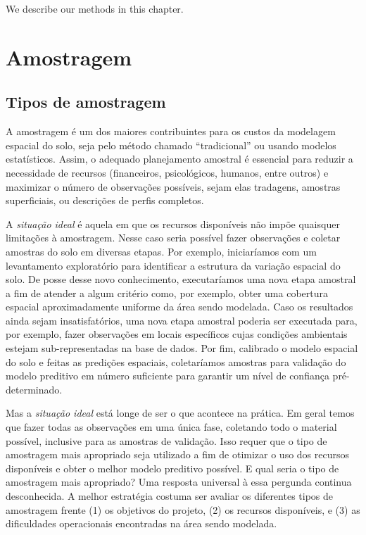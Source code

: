 \documentclass[]{book}
\begin{document}
We describe our methods in this chapter.

\chapter{Amostragem}\label{amostragem}

\section{Tipos de amostragem}\label{tipos-de-amostragem}

A amostragem é um dos maiores contribuintes para os custos da modelagem
espacial do solo, seja pelo método chamado ``tradicional'' ou usando
modelos estatísticos. Assim, o adequado planejamento amostral é
essencial para reduzir a necessidade de recursos (financeiros,
psicológicos, humanos, entre outros) e maximizar o número de observações
possíveis, sejam elas tradagens, amostras superficiais, ou descrições de
perfis completos.

A \emph{situação ideal} é aquela em que os recursos disponíveis não
impõe quaisquer limitações à amostragem. Nesse caso seria possível fazer
observações e coletar amostras do solo em diversas etapas. Por exemplo,
iniciaríamos com um levantamento exploratório para identificar a
estrutura da variação espacial do solo. De posse desse novo
conhecimento, executaríamos uma nova etapa amostral a fim de atender a
algum critério como, por exemplo, obter uma cobertura espacial
aproximadamente uniforme da área sendo modelada. Caso os resultados
ainda sejam insatisfatórios, uma nova etapa amostral poderia ser
executada para, por exemplo, fazer observações em locais específicos
cujas condições ambientais estejam sub-representadas na base de dados.
Por fim, calibrado o modelo espacial do solo e feitas as predições
espaciais, coletaríamos amostras para validação do modelo preditivo em
número suficiente para garantir um nível de confiança pré-determinado.

Mas a \emph{situação ideal} está longe de ser o que acontece na prática.
Em geral temos que fazer todas as observações em uma única fase,
coletando todo o material possível, inclusive para as amostras de
validação. Isso requer que o tipo de amostragem mais apropriado seja
utilizado a fim de otimizar o uso dos recursos disponíveis e obter o
melhor modelo preditivo possível. E qual seria o tipo de amostragem mais
apropriado? Uma resposta universal à essa pergunda continua
desconhecida. A melhor estratégia costuma ser avaliar os diferentes
tipos de amostragem frente (1) os objetivos do projeto, (2) os recursos
disponíveis, e (3) as dificuldades operacionais encontradas na área
sendo modelada.
\end{document}
